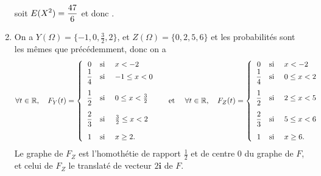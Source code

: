 \documentclass[a4paper, 11pt,reqno]{article}
\begin{document}
\begin{correction}
\begin{enumerate}
		      soit $\displaystyle E(X^2) = \frac{47}{6} $ et donc .
		\item On a $Y(\Omega) = \{-1, 0, \frac{3}{2}, 2\}$, et $Z(\Omega) = \{0, 2,5,6\}$ et les probabilit\'es sont les m\^emes que pr\'ec\'edemment, donc on a
		      $$\forall t \in\R,\quad F_Y(t)=\left\lbrace\begin{array}{ccl}
				      0               & \hbox{si} & \ x<-2                      \\
				      \ddp\frac{1}{4} & \hbox{si} & \ -1\leq x <0\vsec          \\
				      \ddp\frac{1}{2} & \hbox{si} & \ 0\leq x <\frac{3}{2}\vsec \\
				      \ddp\frac{2}{3} & \hbox{si} & \ \frac{3}{2}\leq x<2\vsec  \\
				      1               & \hbox{si} & \ x\geq 2.
			      \end{array}\right.\quad \textmd{ et } \quad \forall t \in\R,\quad
			      F_Z(t)=\left\lbrace\begin{array}{ccl}
				      0               & \hbox{si} & \ x<-2            \\
				      \ddp\frac{1}{4} & \hbox{si} & \ 0\leq x <2\vsec \\
				      \ddp\frac{1}{2} & \hbox{si} & \ 2\leq x <5\vsec \\
				      \ddp\frac{2}{3} & \hbox{si} & \ 5\leq x<6\vsec  \\
				      1               & \hbox{si} & \ x\geq 6.
			      \end{array}\right.$$
		      Le graphe de $F_Z$ est l'homoth\'etie de rapport $\frac{1}{2}$ et de centre $0$ du graphe de $F$, et celui de $F_Z$ le translat\'e de vecteur $2\mathbf{i}$ de $F$.
	\end{enumerate}
\end{correction}


\end{document}
